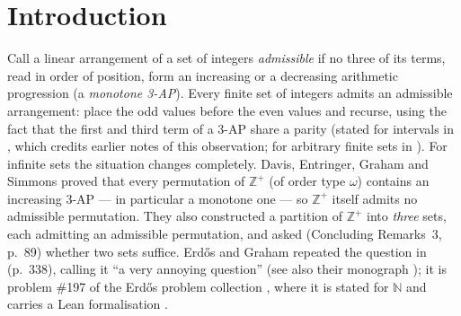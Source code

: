\documentclass[11pt]{article}
\theoremstyle{definition}
\newcommand{\Z}{\mathbb{Z}}
\newcommand{\N}{\mathbb{N}}
\newcommand{\SA}{S_{\mathrm{A}}}
\begin{document}
\begin{abstract}
dichotomy, a transfer lock, and a mirror-flood induction) and exhibits the
mod-$8$ arithmetic as a residue condition on two flood centers; every step
of the two forcing theorems is machine-verified at $100$ resp.\ $51$ scales
up to $M = 1024$ and independently cross-validated. Combining (vi) and (vii):
\textbf{$\SA$ admits no permutation of order type $\omega$ free of monotone
$3$-APs} --- the
canonical dyadic partition does not resolve the Erd\H{o}s--Graham problem.
We also record, in a form convenient here, the absorption property of van der
Corput orderings of odd residue classes (a restatement of a lemma of Geneson)
which explains the fractal structure observed in all satisfying fragments.
Problem \#197 itself remains open: our theorem eliminates one candidate
partition, and decides nothing about other two-set partitions.
\end{abstract}

\section{Introduction}

Call a linear arrangement of a set of integers \emph{admissible} if no three
of its terms, read in order of position, form an increasing or a decreasing
arithmetic progression (a \emph{monotone 3-AP}). Every finite set of integers
admits an admissible arrangement: place the odd values before the even values
and recurse, using the fact that the first and third term of a 3-AP share a
parity (stated for intervals in \cite{DEGS77}, which credits earlier notes of
this observation; for arbitrary finite sets in \cite{ErGr79}). For infinite sets the situation changes completely.
Davis, Entringer, Graham and Simmons \cite{DEGS77} proved that every
permutation of $\Z^+$ (of order type $\omega$) contains an increasing 3-AP ---
in particular a monotone one --- so $\Z^+$ itself admits no admissible
permutation. They also constructed a partition of $\Z^+$ into \emph{three}
sets, each admitting an admissible permutation, and asked (Concluding
Remarks~3, p.~89) whether two sets suffice. Erd\H{o}s and Graham repeated the
question in \cite{ErGr79} (p.~338), calling it ``a very annoying question''
(see also their monograph \cite{ErGr80}); it is problem \#197 of the
Erd\H{o}s problem collection \cite{Bl}, where it is stated for $\N$ and
carries a Lean formalisation \cite{FC}.
\end{document}
